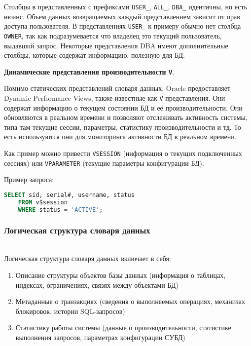 \begin{enumerate}
\begin{enumerate}
    \end{enumerate}

    Столбцы в представленных с префиксами \texttt{USER\_}, \texttt{ALL\_}, \texttt{DBA\_} идентичны, но есть нюанс. Объем данных возвращаемых каждый представлением зависит от прав доступа пользователя. В представлениях \texttt{USER\_} к примеру обычно нет столбца \texttt{OWNER}, так как подразумевается что владелец это текущий пользователь, выдавший запрос. Некоторые представления DBA имеют дополнительные столбцы, которые содержат информацию, полезную для БД.

    \textbf{Динамические представления производительности \texttt{V\textdollar}}. \autocite{oracledbdoc2}

    Помимо статических представлений словаря данных, Oracle предоставляет Dynamic Performance Views, также известные как \texttt{V\textdollar}-представления. Они содержат информацию о текущем состоянии БД и её производительности. Они обновляются в реальном времени и позволяют отслеживать активность системы, типа там текущие сессии, параметры, статистику производительности и тд. То есть используются они для мониторинга активности БД в реальном времени.

    Как пример можно привести \texttt{V\textdollar SESSION} (информация о текущих подключенных сессиях) или \texttt{V\textdollar PARAMETER} (текущие параметры конфигурации БД).

    Пример запроса:
    \begin{lstlisting}[language=SQL]
    SELECT sid, serial#, username, status 
    FROM v$session 
    WHERE status = 'ACTIVE';
    \end{lstlisting}
    
\end{enumerate}

\subsubsection{Логическая структура словаря данных} ~\\

Логическая структура словаря данных \autocite{PostgreSQLdocc51,ElmasriNavathe,Silberschatz} включает в себя:

\begin{enumerate}
    \item Описание структуры объектов базы данных (информация о таблицах, индексах, ограничениях, связях между объектами БД)
    \item Метаданные о транзакциях (сведения о выполняемых операциях, механизах блокировок, истории SQL-запросов)
    \item Статистику работы системы (данные о производительности, статистике выполнения запросов, параметрах конфигурации СУБД)
\end{enumerate}

